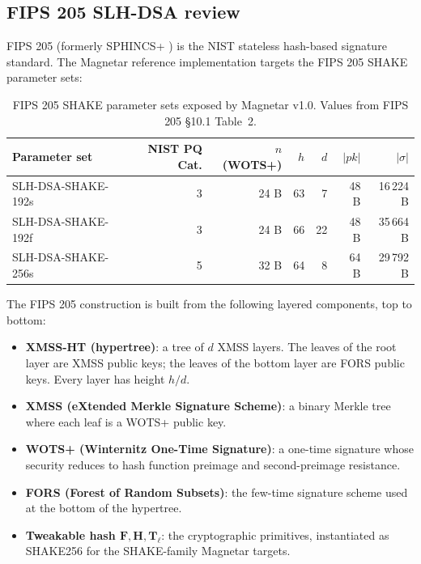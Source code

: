 \subsection{FIPS 205 SLH-DSA review}
\label{sec:prelim:slhdsa}

FIPS 205 \cite{fips205} (formerly SPHINCS+ \cite{sphincs}) is the NIST
stateless hash-based signature standard. The Magnetar reference
implementation targets the FIPS 205 SHAKE parameter sets:
\begin{table}[H]
\centering
\caption{FIPS 205 SHAKE parameter sets exposed by Magnetar v1.0.
Values from FIPS 205 \cite{fips205} \S10.1 Table~2.}
\label{tab:fips205-params}
\begin{tabular}{lrrrrrr}
\toprule
Parameter set & NIST PQ Cat. & $n$ (WOTS+) & $h$ & $d$ & $|pk|$ & $|\sigma|$ \\
\midrule
SLH-DSA-SHAKE-192s & 3 & 24 B & 63 & 7 & 48 B & 16\,224 B \\
SLH-DSA-SHAKE-192f & 3 & 24 B & 66 & 22 & 48 B & 35\,664 B \\
SLH-DSA-SHAKE-256s & 5 & 32 B & 64 & 8 & 64 B & 29\,792 B \\
\bottomrule
\end{tabular}
\end{table}

The FIPS 205 construction is built from the following layered
components, top to bottom:
\begin{itemize}[leftmargin=2em,nosep]
  \item \textbf{XMSS-HT (hypertree)}: a tree of $d$ XMSS layers. The
        leaves of the root layer are XMSS public keys; the leaves of
        the bottom layer are FORS public keys. Every layer has height
        $h/d$.
  \item \textbf{XMSS (eXtended Merkle Signature Scheme)}: a binary
        Merkle tree where each leaf is a WOTS+ public key.
  \item \textbf{WOTS+ (Winternitz One-Time Signature)}: a one-time
        signature whose security reduces to hash function preimage
        and second-preimage resistance.
  \item \textbf{FORS (Forest of Random Subsets)}: the few-time
        signature scheme used at the bottom of the hypertree.
  \item \textbf{Tweakable hash $\mathbf{F}, \mathbf{H}, \mathbf{T}_\ell$}:
        the cryptographic primitives, instantiated as SHAKE256 for the
        SHAKE-family Magnetar targets.
\end{itemize}

